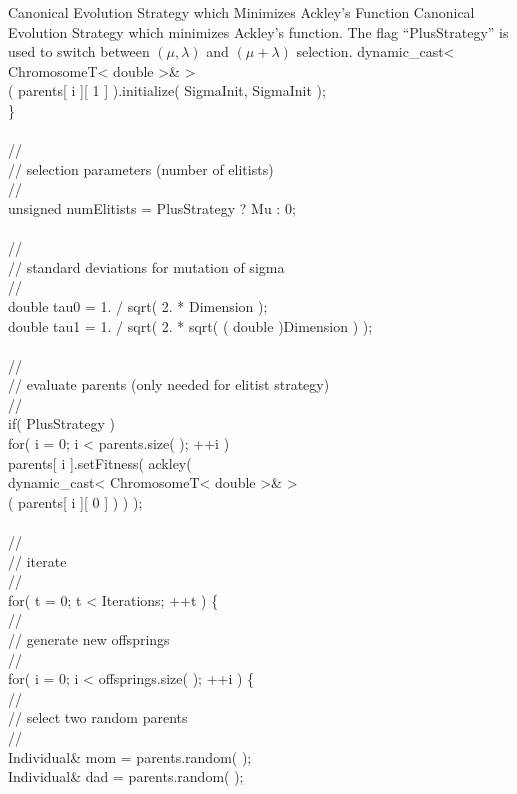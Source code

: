 \begin{programlisting}{Canonical Evolution Strategy which Minimizes Ackley's Function}{
    Canonical Evolution Strategy which minimizes Ackley's function.
    The flag ``PlusStrategy'' is used to switch between $(\mu,\lambda)$
    and $(\mu+\lambda)$ selection.}
        dynamic_cast< ChromosomeT< double >& >\\
            ( parents[ i ][ 1 ] ).initialize( SigmaInit, SigmaInit );\\
    \}\\
\\
    //\\
    // selection parameters (number of elitists)\\
    //\\
    unsigned numElitists = PlusStrategy ? Mu : 0;\\
\\
    //\\
    // standard deviations for mutation of sigma\\
    //\\
    double     tau0 = 1. / sqrt( 2. * Dimension );\\
    double     tau1 = 1. / sqrt( 2. * sqrt( ( double )Dimension ) );\\
\\
    //\\
    // evaluate parents (only needed for elitist strategy)\\
    //\\
    if( PlusStrategy )\\
        for( i = 0; i < parents.size( ); ++i )\\
            parents[ i ].setFitness( ackley(\\
                dynamic_cast< ChromosomeT< double >& >\\
                    ( parents[ i ][ 0 ] ) ) );\\
\\
    //\\
    // iterate\\
    //\\
    for( t = 0; t < Iterations; ++t ) \{\\
        //\\
        // generate new offsprings\\
        //\\
        for( i = 0; i < offsprings.size( ); ++i ) \{\\
            //\\
            // select two random parents\\
            //\\
            Individual& mom = parents.random( );\\
            Individual& dad = parents.random( );\\

\end{programlisting}
